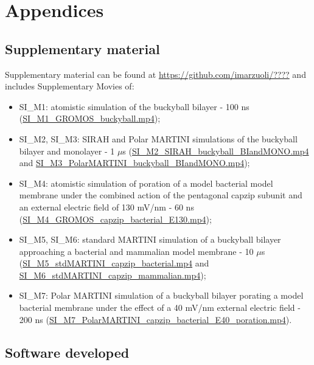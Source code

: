 
\setcounter{chapter}{-1}
\chapter{Appendices} \label{appendix}
\renewcommand{\thechapter}{A}


\section{Supplementary material}
\label{sec:SI}
Supplementary material can be found at \url{https://github.com/imarzuoli/????} and includes Supplementary Movies of:
\begin{itemize}
\item SI\_M1: atomistic simulation of the buckyball bilayer - 100 ns (\url{SI_M1_GROMOS_buckyball.mp4});
\item SI\_M2, SI\_M3: SIRAH and Polar MARTINI simulations of the buckyball bilayer and monolayer - 1 $\mu$s (\url{SI_M2_SIRAH_buckyball_BIandMONO.mp4} and \url{SI_M3_PolarMARTINI_buckyball_BIandMONO.mp4});
\item SI\_M4: atomistic simulation of poration of a model bacterial model membrane under the combined action of the pentagonal capzip subunit and an external electric field of 130 mV/nm - 60 ns (\url{SI_M4_GROMOS_capzip_bacterial_E130.mp4});
\item SI\_M5, SI\_M6: standard MARTINI simulation of a buckyball bilayer approaching a bacterial and mammalian model membrane - 10 $\mu$s (\url{SI_M5_stdMARTINI_capzip_bacterial.mp4} and \url{SI_M6_stdMARTINI_capzip_mammalian.mp4});
\item SI\_M7: Polar MARTINI simulation of a buckyball bilayer porating a model bacterial membrane under the effect of a 40 mV/nm external electric field - 200 ns (\url{SI_M7_PolarMARTINI_capzip_bacterial_E40_poration.mp4}).
\end{itemize}


\section{Software developed}
\label{sec:Appendix_software}

